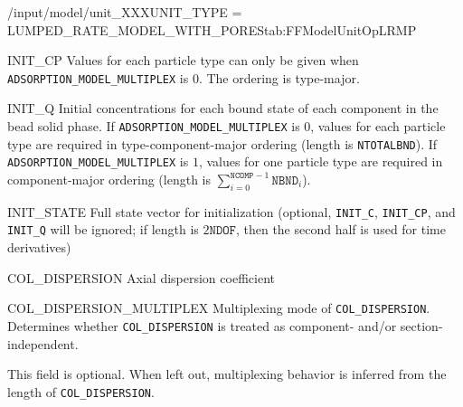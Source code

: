 \begin{condsubgroup}{/input/model/unit\_XXX}{UNIT\_TYPE = LUMPED\_RATE\_MODEL\_WITH\_PORES}{tab:FFModelUnitOpLRMP}
\begin{dataset}[unit=\si{\mol\per\cubic\metre\of{MP}},type=double,range={$\geq 0$},length={\texttt{NCOMP} / $\texttt{NPARTYPE} \cdot \texttt{NCOMP}$}]{INIT\_CP}
    Values for each particle type can only be given when \texttt{ADSORPTION\_MODEL\_MULTIPLEX} is $0$.
    The ordering is type-major.
  \end{dataset}
  \begin{dataset}[unit=\si{\mol\per\cubic\metre\of{SP}},type=double,range={$\geq 0$},length={\texttt{NTOTALBND} / $\sum_{i = 0}^{\texttt{NCOMP} - 1} \texttt{NBND}_i$}]{INIT\_Q}
    Initial concentrations for each bound state of each component in the bead solid phase.
    If \texttt{ADSORPTION\_MODEL\_MULTIPLEX} is $0$, values for each particle type are required in type-component-major ordering (length is \texttt{NTOTALBND}).
    If \texttt{ADSORPTION\_MODEL\_MULTIPLEX} is $1$, values for one particle type are required in component-major ordering (length is $\sum_{i = 0}^{\texttt{NCOMP} - 1} \texttt{NBND}_i$).
  \end{dataset}
  \begin{dataset}[unit=various,type=double,range={$\mathds{R}$},length={\texttt{NDOF} / $2\texttt{NDOF}$}]{INIT\_STATE}
    Full state vector for initialization (optional, \texttt{INIT\_C}, \texttt{INIT\_CP}, and \texttt{INIT\_Q} will be ignored; if length is $2\texttt{NDOF}$, then the second half is used for time derivatives)
  \end{dataset}
  \begin{dataset}[unit=\si{\square\metre\of{IV}\per\second},type=double,range={$\geq 0$},length={see \texttt{COL\_DISPERSION\_MULTIPLEX}}]{COL\_DISPERSION}
    Axial dispersion coefficient
  \end{dataset}
  \begin{dataset}[unit=--,type=int,range={$\{0, \dots, 3 \}$},length={1}]{COL\_DISPERSION\_MULTIPLEX}
    Multiplexing mode of \texttt{COL\_DISPERSION}.
    Determines whether \texttt{COL\_DISPERSION} is treated as component- and/or section-independent.

    This field is optional.
    When left out, multiplexing behavior is inferred from the length of \texttt{COL\_DISPERSION}.


\end{dataset}
\end{condsubgroup}
